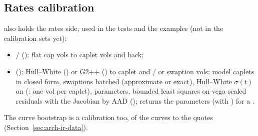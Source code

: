 \subsection{Rates calibration}\label{sec:arch-rates-calibration}
 also holds the rates side, used in the tests and the examples (not in the calibration sets yet):
\begin{itemize}[nosep]
  \item {} / 
        (): flat cap vols to caplet vols and back;
  \item {} (): Hull--White
        () or G2++ () to caplet and / or swaption vols: model caplets in closed form,
        swaptions batched (approximate or exact), Hull--White $\sigma(t)$ on  (: one
        vol per caplet),  parameters, bounded least squares on vega-scaled residuals with the Jacobian by
        AAD (); returns the parameters (with ) for a .
\end{itemize}
The curve bootstrap is a calibration too, of the curves to the quotes (Section~\ref{sec:arch-ir-data}).
